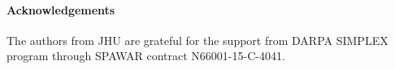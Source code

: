 \documentclass[11pt]{article}
\begin{document}



%
%
%
%
%
%



\paragraph{Acknowledgements} 
{\small
The authors from JHU are grateful for the support  from  DARPA SIMPLEX
program through SPAWAR contract N66001-15-C-4041.
}


\end{document}
